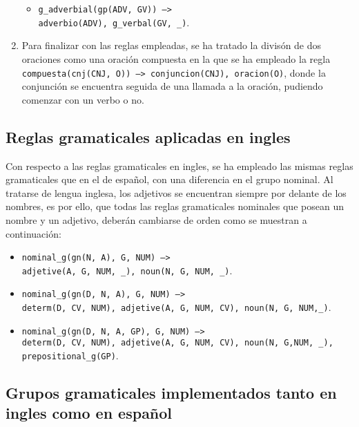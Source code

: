 \documentclass[a4paper]{article}
\begin{document}
\begin{enumerate}
\begin{itemize}
                \item \texttt{g\_adverbial(gp(ADV, GV)) -->\\ adverbio(ADV), g\_verbal(GV, \_)}.

            \end{itemize}

        \item Para finalizar con las reglas empleadas, se ha tratado la divisón de dos oraciones como una oración compuesta en la que se ha empleado la regla \texttt{compuesta(cnj(CNJ, O)) --> conjuncion(CNJ), oracion(O)}, donde la conjunción se encuentra seguida de una llamada a la oración, pudiendo comenzar con un verbo o no.

    \end{enumerate}

    \subsection*{Reglas gramaticales aplicadas en ingles}

        Con respecto a las reglas gramaticales en ingles, se ha empleado las mismas reglas gramaticales que en el de español, con una diferencia en el grupo nominal. Al tratarse de lengua inglesa, los adjetivos se encuentran siempre por delante de los nombres, es por ello, que todas las reglas gramaticales nominales que posean un nombre y un adjetivo, deberán cambiarse de orden como se muestran a continuación:

        \begin{itemize}

            \item \texttt{nominal\_g(gn(N, A), G, NUM) -->\\ adjetive(A, G, NUM, \_), noun(N, G, NUM, \_)}.

            \item \texttt{nominal\_g(gn(D, N, A), G, NUM) -->\\ determ(D, CV, NUM), adjetive(A, G, NUM, CV), noun(N, G, NUM,\_)}.

            \item \texttt{nominal\_g(gn(D, N, A, GP), G, NUM) -->\\ determ(D, CV, NUM), adjetive(A, G, NUM, CV), noun(N, G,NUM, \_), prepositional\_g(GP)}.

        \end{itemize}

    \subsection*{Grupos gramaticales implementados tanto en ingles como en español}
\end{document}
